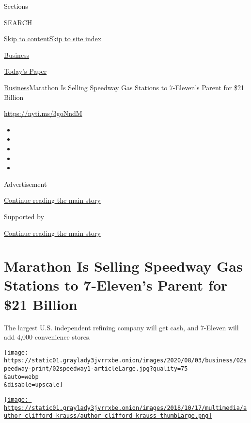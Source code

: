 Sections

SEARCH

\protect\hyperlink{site-content}{Skip to
content}\protect\hyperlink{site-index}{Skip to site index}

\href{https://www.nytimes3xbfgragh.onion/section/business}{Business}

\href{https://myaccount.nytimes3xbfgragh.onion/auth/login?response_type=cookie\&client_id=vi}{}

\href{https://www.nytimes3xbfgragh.onion/section/todayspaper}{Today's
Paper}

\href{/section/business}{Business}\textbar{}Marathon Is Selling Speedway
Gas Stations to 7-Eleven's Parent for \$21 Billion

\url{https://nyti.ms/3goNndM}

\begin{itemize}
\item
\item
\item
\item
\item
\end{itemize}

Advertisement

\protect\hyperlink{after-top}{Continue reading the main story}

Supported by

\protect\hyperlink{after-sponsor}{Continue reading the main story}

\hypertarget{marathon-is-selling-speedway-gas-stations-to-7-elevens-parent-for-21-billion}{%
\section{Marathon Is Selling Speedway Gas Stations to 7-Eleven's Parent
for \$21
Billion}\label{marathon-is-selling-speedway-gas-stations-to-7-elevens-parent-for-21-billion}}

The largest U.S. independent refining company will get cash, and
7-Eleven will add 4,000 convenience stores.

\texttt{[image: https://static01.graylady3jvrrxbe.onion/images/2020/08/03/business/02speedway-print/02speedway1-articleLarge.jpg?quality=75\\\&auto=webp\\\&disable=upscale]}

\href{https://www.nytimes3xbfgragh.onion/by/clifford-krauss}{\texttt{[image: https://static01.graylady3jvrrxbe.onion/images/2018/10/17/multimedia/author-clifford-krauss/author-clifford-krauss-thumbLarge.png]}}


